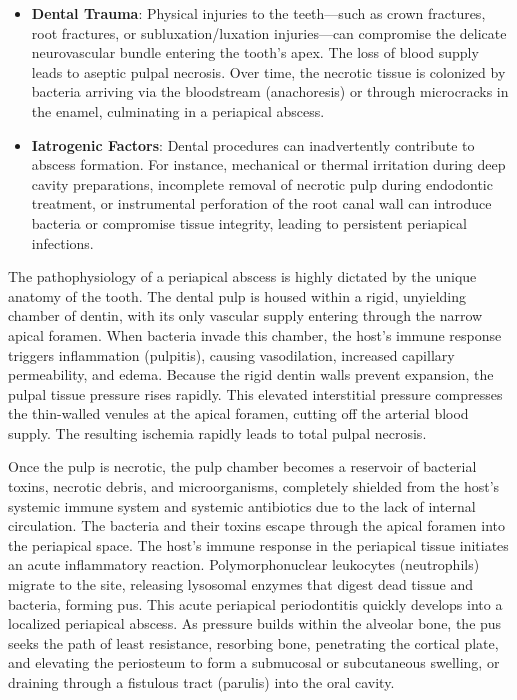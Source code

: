 \begin{itemize}
  \item \textbf{Dental Trauma}: Physical injuries to the teeth---such as crown fractures, root fractures, or subluxation/luxation injuries---can compromise the delicate neurovascular bundle entering the tooth's apex. The loss of blood supply leads to aseptic pulpal necrosis. Over time, the necrotic tissue is colonized by bacteria arriving via the bloodstream (anachoresis) or through microcracks in the enamel, culminating in a periapical abscess.
  \item \textbf{Iatrogenic Factors}: Dental procedures can inadvertently contribute to abscess formation. For instance, mechanical or thermal irritation during deep cavity preparations, incomplete removal of necrotic pulp during endodontic treatment, or instrumental perforation of the root canal wall can introduce bacteria or compromise tissue integrity, leading to persistent periapical infections.
\end{itemize}

The pathophysiology of a periapical abscess is highly dictated by the unique anatomy of the tooth. The dental pulp is housed within a rigid, unyielding chamber of dentin, with its only vascular supply entering through the narrow apical foramen. When bacteria invade this chamber, the host's immune response triggers inflammation (pulpitis), causing vasodilation, increased capillary permeability, and edema. Because the rigid dentin walls prevent expansion, the pulpal tissue pressure rises rapidly. This elevated interstitial pressure compresses the thin-walled venules at the apical foramen, cutting off the arterial blood supply. The resulting ischemia rapidly leads to total pulpal necrosis.

Once the pulp is necrotic, the pulp chamber becomes a reservoir of bacterial toxins, necrotic debris, and microorganisms, completely shielded from the host's systemic immune system and systemic antibiotics due to the lack of internal circulation. The bacteria and their toxins escape through the apical foramen into the periapical space. The host's immune response in the periapical tissue initiates an acute inflammatory reaction. Polymorphonuclear leukocytes (neutrophils) migrate to the site, releasing lysosomal enzymes that digest dead tissue and bacteria, forming pus. This acute periapical periodontitis quickly develops into a localized periapical abscess. As pressure builds within the alveolar bone, the pus seeks the path of least resistance, resorbing bone, penetrating the cortical plate, and elevating the periosteum to form a submucosal or subcutaneous swelling, or draining through a fistulous tract (parulis) into the oral cavity.

